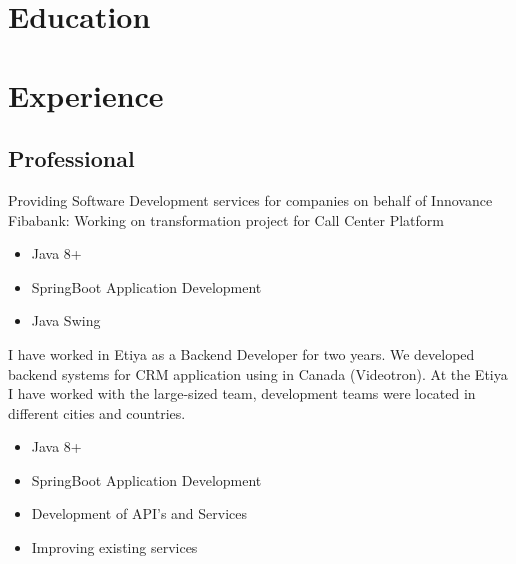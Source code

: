 \documentclass[11pt,a4paper,sans]{moderncv}
\begin{document}
\makecvtitle
\section{Education}

\section{Experience}
\subsection{Professional}
{
	\textnormal
	{
		Providing Software Development services for companies on behalf of Innovance
		\\
		Fibabank: Working on transformation project for Call Center Platform
	}
	\\
	\begin{itemize}%
		\item Java 8+
		\item SpringBoot Application Development
		\item Java Swing \\
	\end{itemize}
}
{
	\textnormal
	{
		I have worked in Etiya as a Backend Developer for two years. We developed backend systems for CRM application using in Canada (Videotron). At the Etiya I have worked with the large-sized team, development teams were located in different cities and countries.
	}
	\\
	\begin{itemize}%
		\item Java 8+
		\item SpringBoot Application Development
		\item Development of API's and Services
		\item Improving existing services \\
	\end{itemize}
}
\end{document}
